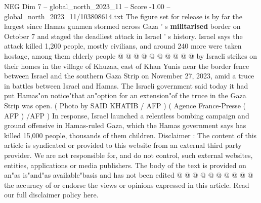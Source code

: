 \begin{textsample}{NEG Dim 7 – global\_north\_2023\_11 – Score -1.00 – global\_north\_2023\_11/103808614.txt}
The figure set for release is by far the largest since Hamas gunmen stormed across Gaza ' s \textbf{militarised} border on October 7 and staged the deadliest attack in Israel ' s history.
Israel says the attack killed 1,200 people, mostly civilians, and around 240 more were taken hostage, among them elderly people @ @ @ @ @ @ @ @ @ @ by Israeli strikes on their homes in the village of Khuzaa, east of Khan Yunis near the border fence between Israel and the southern Gaza Strip on November 27, 2023, amid a truce in battles between Israel and Hamas.
The Israeli government said today it had put Hamas"on notice"that an"option for an extension"of the truce in the Gaza Strip was open. ( Photo by SAID KHATIB / AFP ) ( Agence France-Presse ( AFP ) /AFP ) In response, Israel launched a relentless bombing campaign and ground offensive in Hamas-ruled Gaza, which the Hamas government says has killed 15,000 people, thousands of them children.
Disclaimer : The content of this article is syndicated or provided to this website from an external third party provider.
We are not responsible for, and do not control, such external websites, entities, applications or media publishers.
The body of the text is provided on an"as is"and"as available"basis and has not been edited @ @ @ @ @ @ @ @ @ @ the accuracy of or endorse the views or opinions expressed in this article.
Read our full disclaimer policy here.

\end{textsample}
